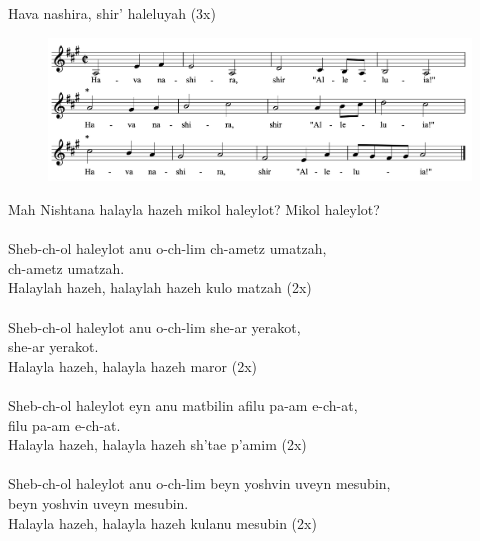 \documentclass[twoside,14pt,openany,letterpaper]{memoir}%
\begin{document}

Hava nashira, shir’ haleluyah (3x)

\begin{figure}[h]
\vspace{3.0cm}
\includegraphics[scale=0.75]{havaNashira}
\centering
\end{figure}


Mah Nishtana halayla hazeh mikol haleylot? Mikol haleylot?\\
\\
Sheb-ch-ol haleylot anu o-ch-lim ch-ametz umatzah,\\
ch-ametz umatzah.\\
Halaylah hazeh, halaylah hazeh kulo matzah (2x)\\
\\
Sheb-ch-ol haleylot anu o-ch-lim she-ar yerakot,\\
she-ar yerakot.\\
Halayla hazeh, halayla hazeh maror (2x)\\
\\
Sheb-ch-ol haleylot eyn anu matbilin afilu pa-am e-ch-at,\\
filu pa-am e-ch-at.\\
Halayla hazeh, halayla hazeh sh’tae p’amim (2x)\\
\\
Sheb-ch-ol haleylot anu o-ch-lim beyn yoshvin uveyn mesubin,\\
beyn yoshvin uveyn mesubin.\\
Halayla hazeh, halayla hazeh kulanu mesubin (2x)\\
\end{document}
